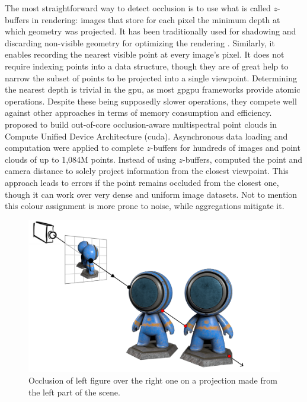 The most straightforward way to detect occlusion is to use what is called $z$-buffers in rendering: images that store for each pixel the minimum depth at which geometry was projected. It has been traditionally used for shadowing and discarding non-visible geometry for optimizing the rendering \cite{akenine-moller_real-time_2018, white_cascaded_2021}. Similarly, it enables recording the nearest visible point at every image's pixel. It does not require indexing points into a data structure, though they are of great help to narrow the subset of points to be projected into a single viewpoint. Determining the nearest depth is trivial in the \acrshort{gpu}, as most \acrshort{gpgpu} frameworks provide atomic operations. Despite these being supposedly slower operations, they compete well against other approaches in terms of memory consumption and efficiency. \cite{jurado_out--core_2022} proposed to build out-of-core occlusion-aware multispectral point clouds in Compute Unified Device Architecture (\acrshort{cuda}). Asynchronous data loading and computation were applied to complete $z$-buffers for hundreds of images and point clouds of up to 1,084M points. Instead of using $z$-buffers, \cite{jo_dense_2021} computed the point and camera distance to solely project information from the closest viewpoint. This approach leads to errors if the point remains occluded from the closest one, though it can work over very dense and uniform image datasets. Not to mention this colour assignment is more prone to noise, while aggregations mitigate it. 

\begin{figure}[ht]
	\includegraphics[width=\textwidth]{figs/fundamentals/occlusion.png}
	\caption{Occlusion of left figure over the right one on a projection made from the left part of the scene. }
    \label{fig:occlusion_concept}
\end{figure}

